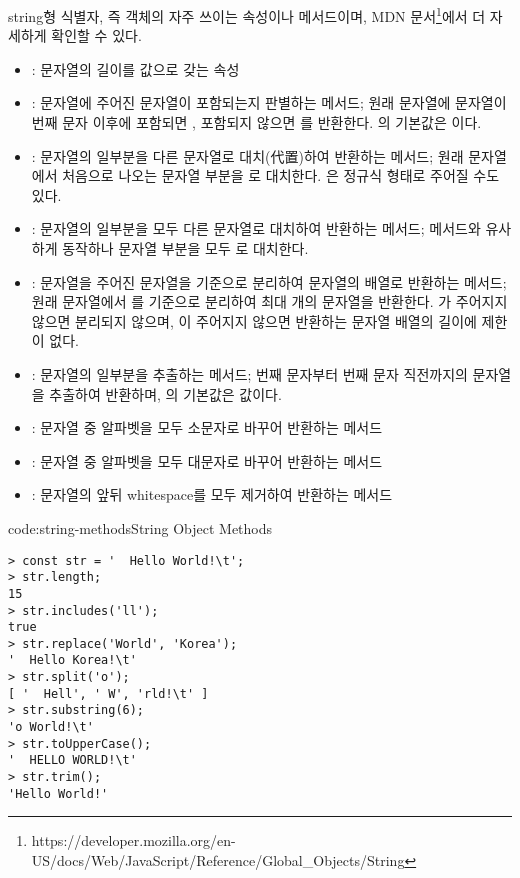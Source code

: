 string형 식별자, 즉  객체의 자주 쓰이는 속성이나 메서드이며, MDN 문서\footnote{https://developer.mozilla.org/en-US/docs/Web/JavaScript/Reference/Global\_Objects/String}에서 더 자세하게 확인할 수 있다.

\begin{itemize}
    \item {}: 문자열의 길이를 값으로 갖는 속성
    \item {}: 문자열에 주어진 문자열이 포함되는지 판별하는 메서드; 원래 문자열에  문자열이 번째 문자 이후에 포함되면 , 포함되지 않으면 를 반환한다. 의 기본값은 이다.
    \item {}: 문자열의 일부분을 다른 문자열로 대치(代置)하여 반환하는 메서드; 원래 문자열에서 처음으로 나오는  문자열 부분을 로 대치한다. 은 정규식 형태로 주어질 수도 있다.
    \item {}: 문자열의 일부분을 모두 다른 문자열로 대치하여 반환하는 메서드;  메서드와 유사하게 동작하나  문자열 부분을 모두 로 대치한다.
    \item {}: 문자열을 주어진 문자열을 기준으로 분리하여 문자열의 배열로 반환하는 메서드; 원래 문자열에서 를 기준으로 분리하여 최대 개의 문자열을 반환한다. 가 주어지지 않으면 분리되지 않으며, 이 주어지지 않으면 반환하는 문자열 배열의 길이에 제한이 없다.
    \item {}: 문자열의 일부분을 추출하는 메서드; 번째 문자부터 번째 문자 직전까지의 문자열을 추출하여 반환하며, 의 기본값은  값이다.
    \item {}: 문자열 중 알파벳을 모두 소문자로 바꾸어 반환하는 메서드
    \item {}: 문자열 중 알파벳을 모두 대문자로 바꾸어 반환하는 메서드
    \item {}: 문자열의 앞뒤 whitespace를 모두 제거하여 반환하는 메서드
\end{itemize}

\begin{codeenv}{code:string-methods}{String Object Methods}\begin{verbatim}
> const str = '  Hello World!\t';
> str.length;
15
> str.includes('ll');
true
> str.replace('World', 'Korea');
'  Hello Korea!\t'
> str.split('o');
[ '  Hell', ' W', 'rld!\t' ]
> str.substring(6);
'o World!\t'
> str.toUpperCase();
'  HELLO WORLD!\t'
> str.trim();
'Hello World!'
\end{verbatim}
\end{codeenv}

